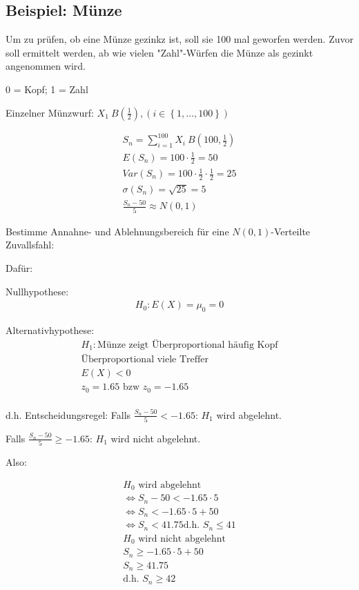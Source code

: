 \subsection{Beispiel: Münze}

Um zu prüfen, ob eine Münze gezinkz ist, soll sie 100 mal geworfen werden. Zuvor soll ermittelt werden, ab wie vielen "Zahl"-Würfen die Münze als gezinkt angenommen wird.

0 = Kopf; 1 = Zahl

Einzelner Münzwurf: $X_1 ~ B\left(\frac{1}{2}\right), (i \in \left\{1, \dots, 100\right\})$

\begin{align*}
    S_n = \sum_{i=1}^{100} X_i ~ B\left(100, \frac{1}{2}\right) \\
    E(S_n) = 100 \cdot \frac{1}{2} = 50 \\
    Var(S_n) = 100 \cdot \frac{1}{2} \cdot \frac{1}{2} = 25 \\
    \sigma (S_n) = \sqrt{25} = 5 \\
    \frac{S_n - 50}{5} \approx N(0,1)
\end{align*}

Bestimme Annahne- und Ablehnungsbereich für eine $N(0,1)$-Verteilte Zuvallsfahl:

Dafür: 

Nullhypothese:
\begin{align*}
    H_0: E(X) = \mu_0 = 0
\end{align*}

Alternativhypothese: 
\begin{align*}
    H_1: \text{Münze zeigt Überproportional häufig Kopf} \\
    \text{Überproportional viele Treffer} \\
    E(X) < 0 \\
    z_0 = 1.65 \text{ bzw } z_0 = -1.65 \\
\end{align*}

d.h. Entscheidungsregel: Falls $\frac{S_n - 50}{5} < -1.65$: $H_1$ wird abgelehnt.

Falls $\frac{S_n - 50}{5} \geq -1.65$: $H_1$ wird nicht abgelehnt.

Also:

\begin{align*}
    H_0 \text{ wird abgelehnt} \\
    \Leftrightarrow S_n - 50 < -1.65 \cdot 5 \\
    \Leftrightarrow S_n < -1.65 \cdot 5 + 50 \\
    \Leftrightarrow S_n < 41.75
    \text{d.h. } S_n \leq 41 \\
    H_0 \text{ wird nicht abgelehnt} \\
    S_n \geq -1.65 \cdot 5 + 50 \\
    S_n \geq 41.75 \\
    \text{d.h. } S_n \geq 42
\end{align*}

